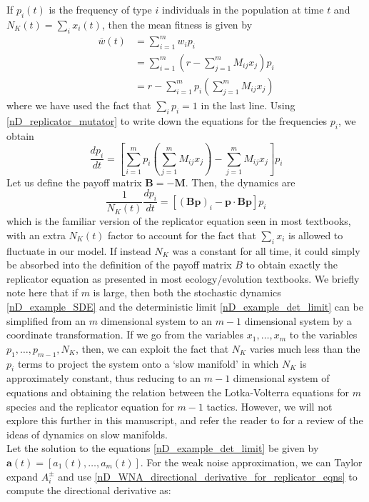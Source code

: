 If $p_i(t)$ is the frequency of type $i$ individuals in the population at time $t$ and $N_K(t) = \sum_i x_i(t)$, then the mean fitness is given by
\begin{align}
\overline{w}(t) &= \sum\limits_{i=1}^{m}w_ip_i\\
&= \sum\limits_{i=1}^{m}\left(r - \sum\limits_{j=1}^{m}M_{ij}x_j\right)p_i\\
&= r - \sum\limits_{i=1}^{m}p_i\left(\sum\limits_{j=1}^{m}M_{ij}x_j\right)
\end{align}
where we have used the fact that $\sum_i p_i = 1$ in the last line. Using \eqref{nD_replicator_mutator} to write down the equations for the frequencies $p_i$, we obtain
\begin{equation}
\frac{dp_i}{dt} = \left[\sum\limits_{i=1}^{m}p_i\left(\sum\limits_{j=1}^{m}M_{ij}x_j\right) - \sum\limits_{j=1}^{m}M_{ij}x_j\right]p_i
\end{equation}
Let us define the payoff matrix $\mathbf{B} = - \mathbf{M}$. Then, the dynamics are
\begin{equation}
\frac{1}{N_K(t)}\frac{dp_i}{dt} = \left[(\mathbf{Bp})_i - \mathbf{p}\cdot\mathbf{Bp}\right]p_i   
\end{equation}
which is the familiar version of the replicator equation seen in most textbooks, with an extra $N_K(t)$ factor to account for the fact that $\sum_i x_i$ is allowed to fluctuate in our model. If instead $N_K$ was a constant for all time, it could simply be absorbed into the definition of the payoff matrix $B$ to obtain exactly the replicator equation as presented in most ecology/evolution textbooks. We briefly note here that if $m$ is large, then both the stochastic dynamics \eqref{nD_example_SDE} and the deterministic limit \eqref{nD_example_det_limit} can be simplified from an $m$ dimensional system to an $m-1$ dimensional system by a coordinate transformation. If we go from the variables $x_1,\ldots,x_m$ to the variables $p_1,\ldots,p_{m-1},N_K$, then, we can exploit the fact that $N_K$ varies much less than the $p_i$ terms to project the system onto a `slow manifold' in which $N_K$ is approximately constant, thus reducing to an $m-1$ dimensional system of equations and obtaining the relation between the Lotka-Volterra equations for $m$ species and the replicator equation for $m-1$ tactics. However, we will not explore this further in this manuscript, and refer the reader to \citep{constable_stochastic_2013} for a review of the ideas of dynamics on slow manifolds.\\
Let the solution to the equations \eqref{nD_example_det_limit} be given by $\mathbf{a}(t) = [a_1(t),\ldots,a_m(t)]$. For the weak noise approximation, we can Taylor expand $A^{\pm}_i$ and use \eqref{nD_WNA_directional_derivative_for_replicator_eqns} to compute the directional derivative as:
